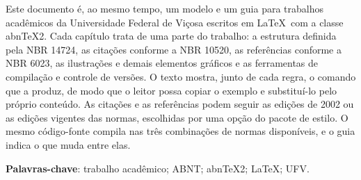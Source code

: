 \documentclass[
	12pt, %
	openright, %
	oneside, %
	a4paper, %
	sumario=tradicional, %
	english, %
	brazil, %
]{abntex2}
\begin{document}
\frenchspacing
\pretextual

\imprimircapa

\imprimirfolhaderosto


%

%

%


\begin{resumo}
	\noindent
	Este documento é, ao mesmo tempo, um modelo e um guia para trabalhos acadêmicos da Universidade Federal de Viçosa escritos em \LaTeX\ com a classe abn\TeX2. Cada capítulo trata de uma parte do trabalho: a estrutura definida pela NBR 14724, as citações conforme a NBR 10520, as referências conforme a NBR 6023, as ilustrações e demais elementos gráficos e as ferramentas de compilação e controle de versões. O texto mostra, junto de cada regra, o comando que a produz, de modo que o leitor possa copiar o exemplo e substituí-lo pelo próprio conteúdo. As citações e as referências podem seguir as edições de 2002 ou as edições vigentes das normas, escolhidas por uma opção do pacote de estilo. O mesmo código-fonte compila nas três combinações de normas disponíveis, e o guia indica o que muda entre elas.

	\vspace{\onelineskip}
	\noindent
	\textbf{Palavras-chave}: trabalho acadêmico; ABNT; abn\TeX2; \LaTeX; UFV.
\end{resumo}
\end{document}
